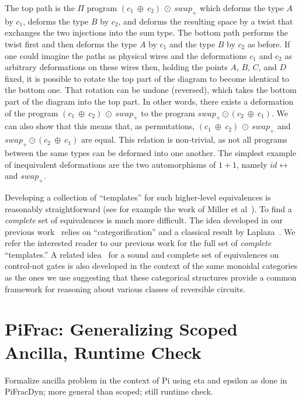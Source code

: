 \documentclass[sigplan,10pt,review,anonymous]{acmart}
\newcommand{\swapp}{\mathit{swap}_+}
\newcommand{\idc}{\mathit{id}\!\!\leftrightarrow}
\begin{document}
\noindent The top path is the $\Pi$ program
$(c_1~\oplus~c_2)~\odot~\swapp$ which deforms the type $A$ by $c_1$,
deforms the type $B$ by $c_2$, and deforms the resulting space by a
twist that exchanges the two injections into the sum type. The bottom
path performs the twist first and then deforms the type $A$ by $c_1$
and the type $B$ by $c_2$ as before. If one could imagine the paths
  as physical wires and the deformations $c_1$ and $c_2$ as arbitrary
deformations on these wires then, holding the points $A$, $B$, $C$,
and $D$ fixed, it is possible to rotate the top part of the diagram to
become identical to the bottom one. That rotation can be undone
(reversed), which takes the bottom part of the diagram into the top
part.  In other words, there exists a deformation of the program
$(c_1~\oplus~c_2)~\odot~\swapp$ to the program
$\swapp \odot (c_2~\oplus~c_1)$. We can also show that this means
that, as permutations, $(c_1~\oplus~c_2)~\odot~\swapp$ and
$\swapp \odot (c_2~\oplus~c_1)$ are equal. This relation is
non-trivial, as not all programs between the same types can be
deformed into one another. The simplest example of inequivalent
deformations are the two automorphisms of $1+1$, namely $\idc$ and
$\swapp$.

Developing a collection of ``templates'' for such higher-level
equivalences is reasonably straightforward (see for example the work
of Miller et al~\cite{Miller:2003:TBA:775832.775915}). To find a
\emph{complete} set of equivalences is much more difficult. The idea
developed in our previous work~\cite{DBLP:conf/esop/CaretteS16} relies
on ``categorification'' and a classical result by
Laplaza~\cite{laplaza}. We refer the interested reader to our previous
work for the full set of \emph{complete} ``templates.'' A related
idea~\cite{DBLP:journals/corr/CockettCS17} for a sound and complete
set of equivalences on control-not gates is also developed in the
context of the same monoidal categories as the ones we use suggesting
that these categorical structures provide a common framework for
reasoning about various classes of reversible circuits.

\section{PiFrac: Generalizing Scoped Ancilla, Runtime Check}

Formalize ancilla problem in the context of Pi using eta and epsilon
as done in PiFracDyn; more general than scoped; still runtime
check.
\end{document}
